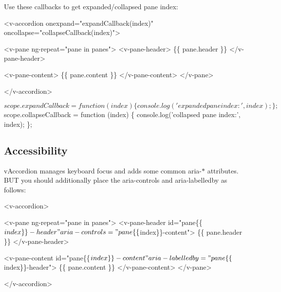 Use these callbacks to get expanded/collapsed pane index\+:


\begin{DoxyCode}
<v-accordion onexpand="expandCallback(index)" oncollapse="collapseCallback(index)">

  <v-pane ng-repeat="pane in panes">
    <v-pane-header>
      \{\{ pane.header \}\}
    </v-pane-header>

    <v-pane-content>
      \{\{ pane.content \}\}
    </v-pane-content>
  </v-pane>

</v-accordion>
\end{DoxyCode}



\begin{DoxyCode}
$scope.expandCallback = function (index) \{
  console.log('expanded pane index:', index);
\};

$scope.collapseCallback = function (index) \{
  console.log('collapsed pane index:', index);
\};
\end{DoxyCode}


\subsection*{Accessibility}

v\+Accordion manages keyboard focus and adds some common aria-\/$\ast$ attributes. B\+UT you should additionally place the {\ttfamily aria-\/controls} and {\ttfamily aria-\/labelledby} as follows\+:


\begin{DoxyCode}
<v-accordion>

  <v-pane ng-repeat="pane in panes">
    <v-pane-header id="pane\{\{$index\}\}-header" aria-controls="pane\{\{$index\}\}-content">
      \{\{ pane.header \}\}
    </v-pane-header>

    <v-pane-content id="pane\{\{$index\}\}-content" aria-labelledby="pane\{\{$index\}\}-header">
      \{\{ pane.content \}\}
    </v-pane-content>
  </v-pane>

</v-accordion>
\end{DoxyCode}
 